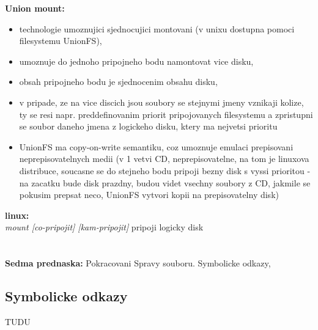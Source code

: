 \documentclass[a4paper, 11pt]{article}
\begin{document}
\textbf{Union mount:}
\begin{itemize}
    \item technologie umoznujici sjednocujici montovani (v unixu dostupna pomoci filesystemu UnionFS),
    \item umoznuje do jednoho pripojneho bodu namontovat vice disku,
    \item obsah pripojneho bodu je sjednocenim obsahu disku,
    \item v pripade, ze na vice discich jsou soubory se stejnymi jmeny vznikaji kolize, ty se resi napr. preddefinovanim priorit pripojovanych filesystemu a zpristupni se soubor daneho jmena z logickeho disku, ktery ma nejvetsi prioritu
    \item UnionFS ma copy-on-write semantiku, coz umoznuje emulaci prepisovani neprepisovatelnych medii (v 1 vetvi CD, neprepisovatelne, na tom je linuxova distribuce, soucasne se do stejneho bodu pripoji bezny disk s vyssi prioritou - na zacatku bude disk prazdny, budou videt vsechny soubory z CD, jakmile se pokusim prepsat neco, UnionFS vytvori kopii na prepisovatelny disk) \\
\end{itemize}

\textbf{linux:} \\[0.5em]
\textit{mount [co-pripojit] [kam-pripojit]} pripoji logicky disk \\

\newpage

\section{}
\textbf{Sedma prednaska:} Pokracovani Spravy souboru. Symbolicke odkazy, 
\subsection{Symbolicke odkazy}
TUDU
\end{document}
